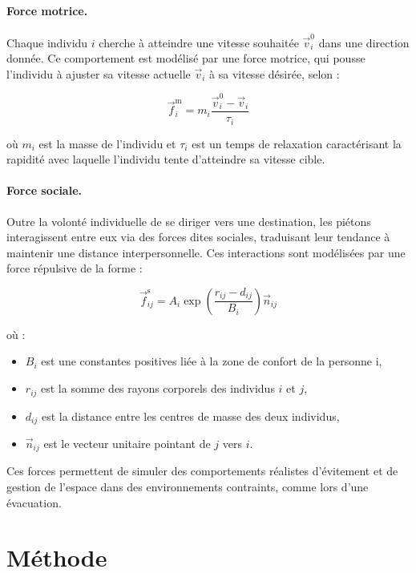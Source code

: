 \documentclass[a4paper,12pt]{article}
\begin{document}
\paragraph{Force motrice.}
Chaque individu $i$ cherche à atteindre une vitesse souhaitée $\vec{v}_i^0$ dans une direction donnée. Ce comportement est modélisé par une force motrice, qui pousse l'individu à ajuster sa vitesse actuelle $\vec{v}_i$ à sa vitesse désirée, selon :

\begin{equation}
\label{eq:force_motrice}
\vec{f}_i^{\text{m}} = m_i \frac{\vec{v}_i^0 - \vec{v}_i}{\tau_i}
\end{equation}

où $m_i$ est la masse de l'individu et $\tau_i$ est un temps de relaxation caractérisant la rapidité avec laquelle l'individu tente d’atteindre sa vitesse cible.

\paragraph{Force sociale.}
Outre la volonté individuelle de se diriger vers une destination, les piétons interagissent entre eux via des forces dites sociales, traduisant leur tendance à maintenir une distance interpersonnelle. Ces interactions sont modélisées par une force répulsive de la forme :

\begin{equation}
\label{eq:force_sociale}
\vec{f}_{ij}^{\text{s}} = A_i \exp\left(\frac{r_{ij} - d_{ij}}{B_i}\right) \vec{n}_{ij}
\end{equation}

où :
\begin{itemize}
  \item  $B_i$ est une constantes positives liée à la zone de confort de la personne i,
  \item $r_{ij}$ est la somme des rayons corporels des individus $i$ et $j$,
  \item $d_{ij}$ est la distance entre les centres de masse des deux individus,
  \item $\vec{n}_{ij}$ est le vecteur unitaire pointant de $j$ vers $i$.
\end{itemize}

Ces forces permettent de simuler des comportements réalistes d’évitement et de gestion de l’espace dans des environnements contraints, comme lors d’une évacuation.


\section{Méthode}
\end{document}

